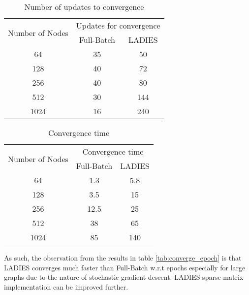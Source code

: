 \begin{table}[H]
    \centering
    \begin{tabular}{|c|c|c|}
        \hline
        \multirow{2}{*}{Number of Nodes} & \multicolumn{2}{c|}{Updates for convergence} \\ \cline{2-3} 
             & Full-Batch & LADIES \\ \hline
        64   & 35         & 50     \\ \hline
        128  & 40         & 72     \\ \hline
        256  & 40         & 80     \\ \hline
        512  & 30         & 144    \\ \hline
        1024 & 16         & 240    \\ \hline
    \end{tabular}
    \caption{Number of updates to convergence}
    \label{tab:update_convergence}
\end{table}

\begin{table}[H]
    \centering
    \begin{tabular}{|c|c|c|}
        \hline
        \multirow{2}{*}{Number of Nodes} & \multicolumn{2}{c|}{Convergence time} \\ \cline{2-3} & Full-Batch & LADIES \\ \hline
        64              & 1.3        & 5.8    \\ \hline
        128             & 3.5        & 15     \\ \hline
        256             & 12.5       & 25     \\ \hline
        512             & 38         & 65     \\ \hline
        1024            & 85         & 140    \\ \hline
    \end{tabular}
    \caption{Convergence time}
    \label{tab:converge_time}
\end{table}

As such, the observation from the results in table \ref{tab:converge_epoch} is that LADIES converges much faster than Full-Batch w.r.t epochs especially for large graphs due to the nature of stochastic gradient descent. LADIES sparse matrix implementation can be improved further.
